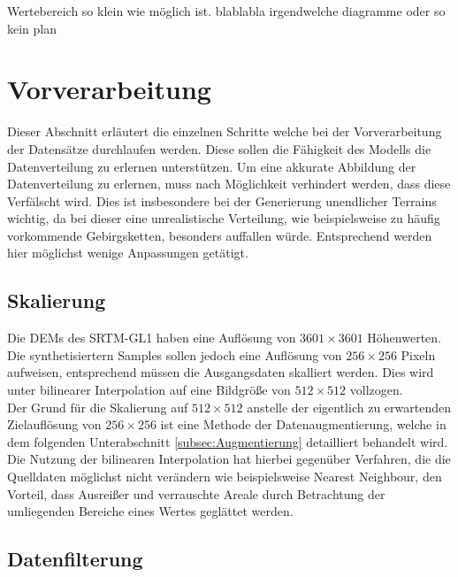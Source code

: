 Wertebereich so klein wie möglich ist.  blablabla irgendwelche diagramme oder so kein plan

\section{Vorverarbeitung}

Dieser Abschnitt erläutert die einzelnen Schritte welche bei der Vorverarbeitung der Datensätze durchlaufen werden. Diese sollen die Fähigkeit des Modells die Datenverteilung zu erlernen unterstützen. Um eine akkurate Abbildung der Datenverteilung zu erlernen, muss nach Möglichkeit verhindert werden, dass diese Verfälscht wird. Dies ist insbesondere bei der Generierung unendlicher Terrains wichtig, da bei dieser eine unrealistische Verteilung, wie beispielsweise zu häufig vorkommende Gebirgsketten, besonders auffallen würde. Entsprechend werden hier möglichst wenige Anpassungen getätigt.

\subsection{Skalierung}

Die \ac{DEM}s des SRTM-GL1 haben eine Auflösung von $3601\times3601$ Höhenwerten. Die synthetisiertern Samples sollen jedoch eine Auflösung von $256\times256$ Pixeln aufweisen, entsprechend müssen die Ausgangsdaten skalliert werden. Dies wird unter bilinearer Interpolation auf eine Bildgröße von $512\times512$ vollzogen. \\ 
Der Grund für die Skalierung auf $512\times512$ anstelle der eigentlich zu erwartenden Zielauflösung von $256\times256$ ist eine Methode der Datenaugmentierung, welche in dem folgenden Unterabschnitt \ref{subsec:Augmentierung} detailliert behandelt wird. \\
Die Nutzung der bilinearen Interpolation hat hierbei gegenüber Verfahren, die die Quelldaten möglichst nicht verändern wie beispielsweise Nearest Neighbour, den Vorteil, dass Ausreißer und verrauschte Areale durch Betrachtung der umliegenden Bereiche eines Wertes geglättet werden. 

\subsection{Datenfilterung}

